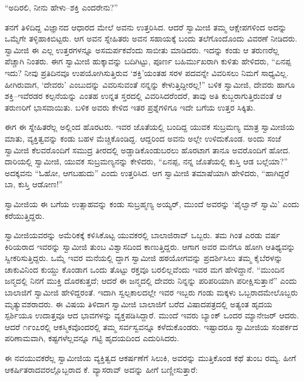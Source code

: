 “ಅದಿರಲಿ, ನೀನು ಹೇಳು–ಶಕ್ತಿ ಎಂದರೇನು?”

ತನಗೆ ತಿಳಿದಿದ್ದ ವಿಜ್ಞಾನದ ಆಧಾರದ ಮೇಲೆ ಅವನು ಉತ್ತರಿಸಿದ. ಆದರೆ ಸ್ವಾಮೀಜಿ ತಮ್ಮ ಆಕ್ಷೇಪಗಳಿಂದ ಅದನ್ನು ಒಮ್ಮೆಗೇ ತಳ್ಳಿಹಾಕಿಬಿಟ್ಟರು. ಆಗ ಅವನ ಸ್ನೇಹಿತರು ಅವನ ಸಹಾಯಕ್ಕೆ ಬಂದು ತಲೆಗೊಂದೊಂದು ವಿವರಣೆ ನೀಡಿದರು. ಸ್ವಾಮೀಜಿ ಈ ಎಲ್ಲ ಉತ್ತರಗಳನ್ನೂ ಅಸಮರ್ಪಕವೆಂದು ಸಾಬೀತು ಮಾಡಿದರು. ಇದನ್ನು ಕಂಡು ಆ ತರುಣರೆಲ್ಲ ಪೆಚ್ಚಾಗಿ ನಿಂತರು. ಈಗ ಸ್ವಾಮೀಜಿ ಹುಕ್ಕಾವನ್ನು ಬದಿಗಿಟ್ಟು, ಪೂರ್ಣ ಬಹಿರ್ಮುಖರಾಗಿ ಕುಳಿತು ಹೇಳಿದರು, “ಏನಪ್ಪ ಇದು? ನೀವು ಪ್ರತಿದಿನವೂ ಉಪಯೋಗಿಸುತ್ತಿರುವ ‘ಶಕ್ತಿ’ಯಂತಹ ಸರಳ ಪದವನ್ನೇ ವಿವರಿಸಲು ನಿಮಗೆ ಸಾಧ್ಯವಿಲ್ಲ. ಹೀಗಿರುವಾಗ, ‘ದೇವರು’ ಎಂಬುದನ್ನು ವಿವರಿಸುವಂತೆ ನನ್ನನ್ನು ಕೇಳುತ್ತಿದ್ದೀರಲ್ಲ!” ಬಳಿಕ ಸ್ವಾಮೀಜಿ, ದೇವರು ಹಾಗೂ ಶಕ್ತಿ–ಇವೆರಡರ ಕಲ್ಪನೆಯನ್ನು ಎಂತಹ ಉನ್ನತ ಸ್ತರದಲ್ಲಿ ವಿವರಿಸಿದರೆಂದರೆ, ತಾವು ಅತಿ ಕುಬ್ಜರಾಗುತ್ತಿರುವಂತೆ ಆ ತರುಣರಿಗೆ ಭಾಸವಾಯಿತು. ಬಳಿಕ ಅವರು ಕೇಳಿದ ಇತರ ಪ್ರಶ್ನೆಗಳಿಗೂ ಇದೇ ಬಗೆಯ ಉತ್ತರ ಸಿಕ್ಕಿತು.

ಈಗ ಈ ಸ್ನೇಹಿತರೆಲ್ಲ ಅಲ್ಲಿಂದ ಹೊರಟರು. ಇವರ ಜೊತೆಯಲ್ಲಿ ಬಂದಿದ್ದ ಯುವಕ ಸುಬ್ರಮಣ್ಯ ಮಾತ್ರ ಸ್ವಾಮೀಜಿಯ ಮಾತು, ವ್ಯಕ್ತಿತ್ವವನ್ನು ಕಂಡು ಬಹಳ ಮೆಚ್ಚಿಕೊಂಡಿದ್ದ. ಆದ್ದರಿಂದ ಅವನು ಅಲ್ಲೇ ಉಳಿದುಕೊಂಡ. ಅಂದು ಸಂಜೆ ಸ್ವಾಮೀಜಿ ಕೆಲವರೊಂದಿಗೆ ಸಮುದ್ರ ತೀರದಲ್ಲಿ ಅಡ್ಡಾಡಿಕೊಂಡುಬರಲು ಹೊರಟಾಗ ತಾನೂ ಅವರೊಂದಿಗೆ ಹೋದ. ದಾರಿಯಲ್ಲಿ ಸ್ವಾಮೀಜಿ, ಯುವಕ ಸುಬ್ರಮಣ್ಯನನ್ನು ಕೇಳಿದರು, “ಏನಪ್ಪ, ನನ್ನ ಜೊತೆಯಲ್ಲಿ ಕುಸ್ತಿ ಆಡ ಬಲ್ಲೆಯಾ?” ಅದಕ್ಕವನು “ಓಹೋ, ಆಗಬಹುದು” ಎಂದು ಉತ್ತರಿಸಿದ. ಆಗ ಸ್ವಾಮೀಜಿ ತಮಾಷೆಯಾಗಿ ಹೇಳಿದರು, “ಹಾಗಿದ್ದರೆ ಬಾ, ಕುಸ್ತಿ ಆಡೋಣ!”

ಸ್ವಾಮೀಜಿಯ ಈ ಬಗೆಯ ಉತ್ಸಾಹವನ್ನು ಕಂಡು ಸುಬ್ರಹ್ಮಣ್ಯ ಅಯ್ಯರ್, ಮುಂದೆ ಅವರನ್ನು ‘ಪೈಲ್ವಾನ್ ಸ್ವಾಮಿ’ ಎಂದು ಕರೆಯುತ್ತಿದ್ದರು.

ಸ್ವಾಮೀಜಿಯವರನ್ನು ಅಮೆರಿಕಕ್ಕೆ ಕಳಿಸಿಕೊಟ್ಟ ಯುವಕರಲ್ಲಿ ಬಾಲಾಜಿರಾವ್ ಒಬ್ಬರು. ತಮ ಗಿಂತ ಎರಡು ವರ್ಷ ಕಿರಿಯರಾದ ಇವರನ್ನು ಸ್ವಾಮೀಜಿ ತುಂಬ ವಿಶ್ವಾಸದಿಂದ ಕಾಣುತ್ತಿದ್ದರು. ಆಗಾಗ ಅವರ ಮನೆಗೂ ಹೋಗಿ ಆತಿಥ್ಯವನ್ನು ಸ್ವೀಕರಿಸುತ್ತಿದ್ದರು. ಒಮ್ಮೆ ಇವರ ಮನೆಯಲ್ಲಿ ದ್ದಾಗ ಸ್ವಾಮೀಜಿ ಹಠಯೋಗವನ್ನು ಪ್ರದರ್ಶಿಸಿಲು ತಮ್ಮ ಕೈಬೆರಳನ್ನು ಚಾಕುವಿನಿಂದ ಕುಯ್ದು ಕೊಂಡಾಗ ಒಂದು ತೊಟ್ಟು ರಕ್ತವೂ ಬರಲಿಲ್ಲವೆಂದು ಇವರ ಮಗ ಹೇಳಿದ್ದಾನೆ. “ಮುಂದಿನ ಜನ್ಮದಲ್ಲಿ ನಿನಗೆ ಮುಕ್ತಿ ದೊರಕುತ್ತದೆ; ಆದರೆ ಈ ಜನ್ಮದಲ್ಲಿ ದೇವರು ನಿನ್ನನ್ನು ಪರಿಪರಿಯಾಗಿ ಪರೀಕ್ಷಿಸುತ್ತಾನೆ” ಎಂದು ಬಾಲಾಜಿಗೆ ಸ್ವಾಮೀಜಿ ಹೇಳಿದ್ದರಂತೆ. ಇದಾಗಿ ಸ್ವಲ್ಪಕಾಲದಲ್ಲೇ ಇವರ ಇಬ್ಬರು ಗಂಡು ಮಕ್ಕಳು ಒಬ್ಬರಾದಮೇಲೊಬ್ಬರು ಮೃತ್ಯುವಶರಾದರು. ಈ ವಿಷಯ ತಿಳಿದಾಗ ಸ್ವಾಮೀಜಿ ಬಾಲಾಜಿಗೆ ಬರೆದ ವಿಷಾದಪತ್ರದಲ್ಲಿ ಅತ್ಯಂತ ಹೃದಯ ಸ್ಪರ್ಶಿಯೂ ಉದಾತ್ತವೂ ಆದ ಭಾವಗಳನ್ನು ವ್ಯಕ್ತಪಡಿಸಿದ್ದಾರೆ. ಮುಂದೆ ಇವರು ಬ್ಯಾಂಕ್ ಒಂದರ ಮ್ಯಾನೇಜರ್ ಆದರು. ಆದರೆ ೧೯ಂ೭ರಲ್ಲಿ ಆಕಸ್ಮಿಕವೊಂದರಲ್ಲಿ ತಮ್ಮ ಸರ್ವಸ್ವವನ್ನೂ ಕಳೆದುಕೊಂಡರು. ಇಷ್ಟಾದರೂ ಸ್ವಾಮೀಜಿಯ ಸಂಪರ್ಕದ ಪರಿಣಾಮವಾಗಿ, ಕಷ್ಟಗಳೆಲ್ಲವನ್ನೂ ಗಟ್ಟಿ ಹೃದಯದಿಂದ ಎದುರಿಸಿದರು.

ಈ ನವಯುವಕರೆಲ್ಲ ಸ್ವಾಮೀಜಿಯ ವ್ಯಕ್ತಿತ್ವದ ಆಕರ್ಷಣೆಗೆ ಸಿಲುಕಿ, ಅವರನ್ನು ಮುತ್ತಿಕೊಂಡ ಕಥೆ ತುಂಬ ರಮ್ಯ. ಹೀಗೆ ಆಕರ್ಷಿತರಾದವರಲ್ಲೊಬ್ಬರಾದ ಕೆ. ವ್ಯಾಸರಾವ್ ಅದನ್ನು ಹೀಗೆ ಬಣ್ಣೀಸುತ್ತಾರೆ:

